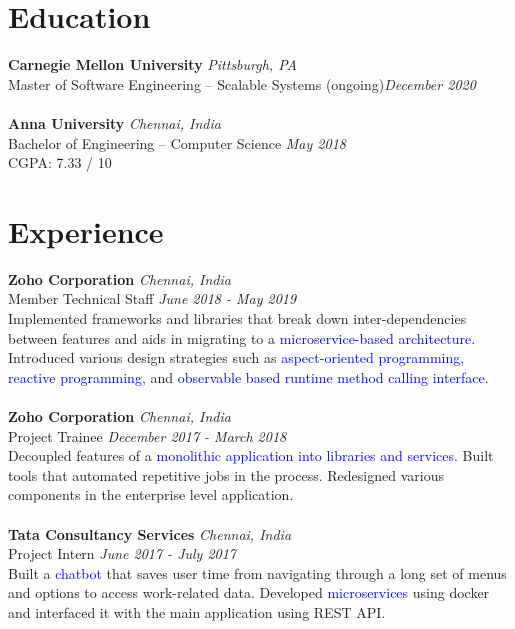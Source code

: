 \documentclass{resume}
\author{https://aravindvasu.dev}{Aravind Vasudevan}
\begin{document}
\maketitle
\section*{Education}
\noindent
\textbf{Carnegie Mellon University} \hfill \textit{Pittsburgh, PA} \\
{\small Master of Software Engineering -- Scalable Systems} (ongoing)\hfill \textit{\small December 2020}  \\
\\
\textbf{Anna University} \hfill \textit{Chennai, India} \\
{\small Bachelor of Engineering -- Computer Science} \hfill \textit{\small May 2018}  \\
{\small CGPA: 7.33 / 10} 

\section*{Experience}
\noindent
\textbf{Zoho Corporation} \hfill \textit{Chennai, India} \\
{\small Member Technical Staff} \hfill \textit{\small June 2018 - May 2019}  \\
Implemented frameworks and libraries that break down inter-dependencies between features and aids in migrating to a \textcolor{blue}{microservice-based architecture}. Introduced various design strategies such as \textcolor{blue}{aspect-oriented programming,} \textcolor{blue}{reactive programming}, and \textcolor{blue}{observable based runtime method calling interface}.\\
\\
\textbf{Zoho Corporation} \hfill \textit{Chennai, India} \\
{\small Project Trainee} \hfill \textit{\small December 2017 - March 2018}  \\
Decoupled features of a \textcolor{blue}{monolithic application into libraries and services}. Built tools that automated repetitive jobs in the process. Redesigned various components in the enterprise level application.\\
\\
\textbf{Tata Consultancy Services} \hfill \textit{Chennai, India} \\
{\small Project Intern} \hfill \textit{\small June 2017 - July 2017}  \\
Built a \textcolor{blue}{chatbot} that saves user time from navigating through a long set of menus and options to access work-related data. Developed \textcolor{blue}{microservices} using docker and interfaced it with the main application using REST API.
\end{document}
